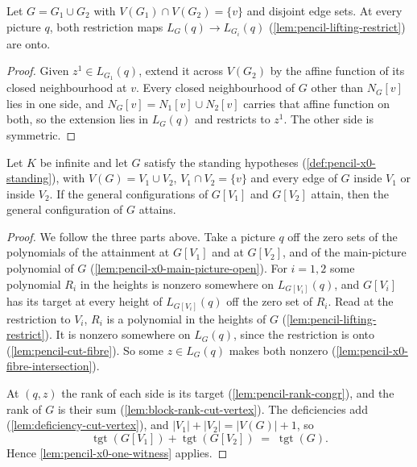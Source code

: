 \begin{lemma}
  \label{lem:pencil-cut-fibre}
  \leanok
  Let $G = G_1 \cup G_2$ with $V(G_1) \cap V(G_2) = \{v\}$ and disjoint
  edge sets. At every picture $q$, both restriction maps
  $L_G(q) \to L_{G_i}(q)$ (\cref{lem:pencil-lifting-restrict}) are onto.
\end{lemma}
\begin{proof}
  \leanok
  Given $z^1 \in L_{G_1}(q)$, extend it across $V(G_2)$ by the affine
  function of its closed neighbourhood at $v$. Every closed
  neighbourhood of $G$ other than $N_G[v]$ lies in one side, and
  $N_G[v] = N_1[v] \cup N_2[v]$ carries that affine function on both, so
  the extension lies in $L_G(q)$ and restricts to $z^1$. The other side
  is symmetric.
\end{proof}

\begin{theorem}
  \label{thm:pencil-x0-cut}
  \leanok
  Let $K$ be infinite and let $G$ satisfy the standing hypotheses
  (\cref{def:pencil-x0-standing}), with $V(G) = V_1 \cup V_2$,
  $V_1 \cap V_2 = \{v\}$ and every edge of $G$ inside $V_1$ or inside
  $V_2$. If the general configurations of $G[V_1]$ and $G[V_2]$ attain,
  then the general configuration of $G$ attains.
\end{theorem}
\begin{proof}
  \leanok
  We follow the three parts above. Take a picture $q$ off the zero sets
  of the polynomials of the attainment at $G[V_1]$ and at $G[V_2]$, and
  of the main-picture polynomial of $G$
  (\cref{lem:pencil-x0-main-picture-open}). For $i = 1, 2$ some
  polynomial $R_i$ in the heights is nonzero somewhere on
  $L_{G[V_i]}(q)$, and $G[V_i]$ has its target at every height of
  $L_{G[V_i]}(q)$ off the zero set of $R_i$. Read at the restriction to
  $V_i$, $R_i$ is a polynomial in the heights of $G$
  (\cref{lem:pencil-lifting-restrict}). It is nonzero somewhere on
  $L_G(q)$, since the restriction is onto (\cref{lem:pencil-cut-fibre}).
  So some $z \in L_G(q)$ makes both nonzero
  (\cref{lem:pencil-x0-fibre-intersection}).

  At $(q, z)$ the rank of each side is its target
  (\cref{lem:pencil-rank-congr}), and the rank of $G$ is their sum
  (\cref{lem:block-rank-cut-vertex}). The deficiencies add
  (\cref{lem:deficiency-cut-vertex}), and $|V_1| + |V_2| = |V(G)| + 1$, so
  \[
    \operatorname{tgt}(G[V_1]) + \operatorname{tgt}(G[V_2]) \;=\;
    \operatorname{tgt}(G).
  \]
  Hence \cref{lem:pencil-x0-one-witness} applies.
\end{proof}

